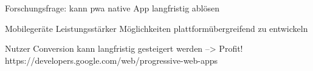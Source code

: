 Forschungsfrage: kann \ac{pwa} native App langfristig ablösen

Mobilegeräte Leistungsstärker
Möglichkeiten plattformübergreifend zu entwickeln

Nutzer Conversion kann langfristig gesteigert werden --> Profit!\\
https://developers.google.com/web/progressive-web-apps
\cite{GooglePWAOverview}
